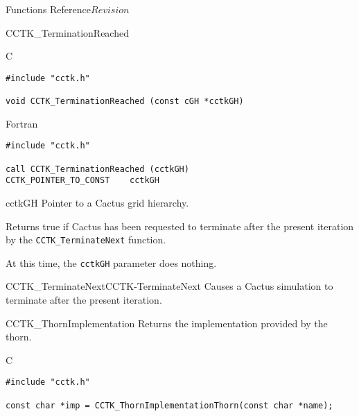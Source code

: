 \begin{cactuspart}{ Functions Reference}{}{$Revision$}
\begin{FunctionDescription}{CCTK\_TerminationReached}
\begin{SynopsisSection}
\begin{Synopsis}{C}
\begin{verbatim}
#include "cctk.h"

void CCTK_TerminationReached (const cGH *cctkGH)
\end{verbatim}
\end{Synopsis}
\begin{Synopsis}{Fortran}
\begin{verbatim}
#include "cctk.h"

call CCTK_TerminationReached (cctkGH)
CCTK_POINTER_TO_CONST    cctkGH
\end{verbatim}
\end{Synopsis}
\end{SynopsisSection}

\begin{ParameterSection}
\begin{Parameter}{cctkGH}
Pointer to a Cactus grid hierarchy.
\end{Parameter}
\end{ParameterSection}

\begin{Discussion}
Returns true if Cactus has been requested to terminate after the present
iteration by the {\tt CCTK\_TerminateNext} function.

At this time, the {\tt cctkGH} parameter does nothing.
\end{Discussion}
\begin{SeeAlsoSection}
\begin{SeeAlso2}{CCTK\_TerminateNext}{CCTK-TerminateNext}
  Causes a Cactus simulation to terminate after the present iteration.
\end{SeeAlso2}
\end{SeeAlsoSection}
\end{FunctionDescription}


\begin{FunctionDescription}{CCTK\_ThornImplementation}
\label{CCTK-ThornImplementation}
Returns the implementation provided by the thorn.

\begin{SynopsisSection}
\begin{Synopsis}{C}
\begin{verbatim}
#include "cctk.h"

const char *imp = CCTK_ThornImplementationThorn(const char *name);
\end{verbatim}
\end{Synopsis}
\end{SynopsisSection}


\end{FunctionDescription}
\end{cactuspart}
